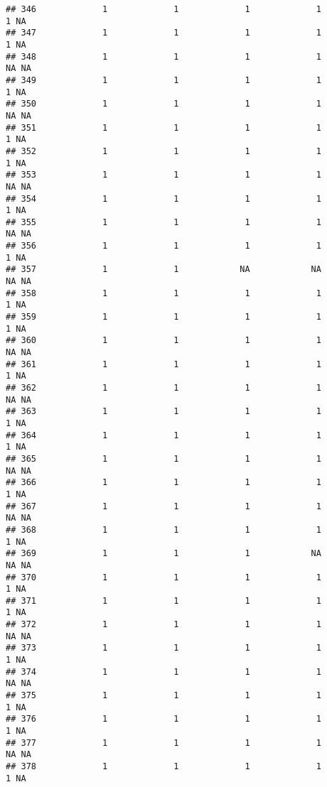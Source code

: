 \documentclass[
]{article}
\begin{document}
\begin{verbatim}
## 346             1             1             1             1             1 NA
## 347             1             1             1             1             1 NA
## 348             1             1             1             1            NA NA
## 349             1             1             1             1             1 NA
## 350             1             1             1             1            NA NA
## 351             1             1             1             1             1 NA
## 352             1             1             1             1             1 NA
## 353             1             1             1             1            NA NA
## 354             1             1             1             1             1 NA
## 355             1             1             1             1            NA NA
## 356             1             1             1             1             1 NA
## 357             1             1            NA            NA            NA NA
## 358             1             1             1             1             1 NA
## 359             1             1             1             1             1 NA
## 360             1             1             1             1            NA NA
## 361             1             1             1             1             1 NA
## 362             1             1             1             1            NA NA
## 363             1             1             1             1             1 NA
## 364             1             1             1             1             1 NA
## 365             1             1             1             1            NA NA
## 366             1             1             1             1             1 NA
## 367             1             1             1             1            NA NA
## 368             1             1             1             1             1 NA
## 369             1             1             1            NA            NA NA
## 370             1             1             1             1             1 NA
## 371             1             1             1             1             1 NA
## 372             1             1             1             1            NA NA
## 373             1             1             1             1             1 NA
## 374             1             1             1             1            NA NA
## 375             1             1             1             1             1 NA
## 376             1             1             1             1             1 NA
## 377             1             1             1             1            NA NA
## 378             1             1             1             1             1 NA

\end{verbatim}
\end{document}
